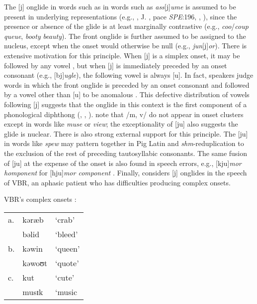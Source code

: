The [j] onglide in words such as in words such as \emph{ass}[j]\emph{ume} is assumed to be present in underlying representations (e.g., \citealt[][278]{Borowsky1986}, J. \citealt{Anderson1988b}, pace \emph{SPE}:196, \citealt[][89]{Halle1985a}, \citealt[][217]{McMahon1990}), since the presence or absence of the glide is at least marginally contrastive (e.g., \emph{coo}/\emph{coup} \alt{} \emph{queue}, \emph{booty} \alt{} \emph{beauty}). The front onglide is further assumed to be assigned to the nucleus, except when the onset would otherwise be null (e.g., \emph{jun}[j]\emph{or}). 
There is extensive motivation for this principle. When [j] is a simplex onset, it may be followed by any vowel \citep[][276]{Borowsky1986}, but when [j] is immediately preceded by an onset consonant (e.g., [bj]\emph{ugle}), the following vowel is always [u\lm]. In fact, speakers judge words in which the front onglide is preceded by an onset consonant and followed by a vowel other than [u\lm] to be anomalous \citep{Moreland2009}. This defective distribution of vowels following [j] suggests that the onglide in this context is the first component of a phonological diphthong (\citealp[][232]{Hayes1980}, \citealp[][61f.]{Harris1994}, \citealp{Davis1995}). \citet[][42]{Clements1983} note that /m, v/ do not appear in onset clusters except in words like \emph{muse} or \emph{view}; the exceptionality of [ju\lm] also suggests the glide is nuclear. There is also strong external support for this principle. The [ju\lm] in words like \emph{spew} may pattern together in Pig Latin \citep{Davis1995,Idsardi2005} and \emph{shm}-reduplication \citep{Nevins2003} to the exclusion of the rest of preceding tautosyllabic consonants. The same fusion of [ju\lm] at the expense of the onset is also found in speech errors, e.g., [kju\lm]\emph{mor homponent} for [hju\lm]\emph{mor component} \citep[][130]{Shattuck-Hufnagel1986}. Finally, \citet{Buchwald2005} considers [j] onglides in the speech of VBR, an aphasic patient who has difficulties producing complex onsets. 

\begin{example}
\label{VBR}
VBR's complex onsets \citep[79--80, his transcriptions]{Buchwald2005}:

\vspace{0.5\baselineskip}
\begin{tabular}{l l l}
a. & kəræb  & `crab'  \\
   & bəlid  & `bleed' \\
b. & kəwin  & `queen' \\
   & kəwoʊt & `quote' \\
c. & kut    & `cute'  \\
   & musɪk  & `music  \\ 
\end{tabular}
\end{example}

